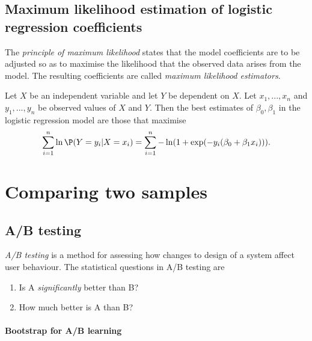 \documentclass{article}
\begin{document}
\subsection{Maximum likelihood estimation of logistic regression coefficients}

\begin{definition}
	The \emph{principle of maximum likelihood} states that the model
	coefficients are to be adjusted so as to maximise the likelihood
	that the observed data arises from the model. The resulting coefficients
	are called \emph{maximum likelihood estimators}.
\end{definition}

\begin{theorem}
	Let $X$ be an independent variable and let $Y$ be dependent on $X$.
	Let $x_1,...,x_n$ and $y_1,...,y_n$ be observed values of $X$ and $Y$.
	Then the best estimates of $\beta_0,\beta_1$ in the logistic regression
	model are those that maximise
	\begin{align*}
		\sum_{i=1}^n\ln\P(Y=y_i|X=x_i) = \sum_{i=1}^n -\ln(1+\exp(-y_i(\beta_0+\beta_1x_i))).
	\end{align*}
\end{theorem}


\section{Comparing two samples}

\subsection{A/B testing}

\begin{definition}
	\emph{A/B testing} is a method for assessing how changes to design of a system
	affect user behaviour. The statistical questions in A/B testing are
	\begin{enumerate}
		\item Is A \emph{significantly} better than B?
		\item How much better is A than B?
	\end{enumerate}
\end{definition}

\paragraph{Bootstrap for A/B learning}
\end{document}
